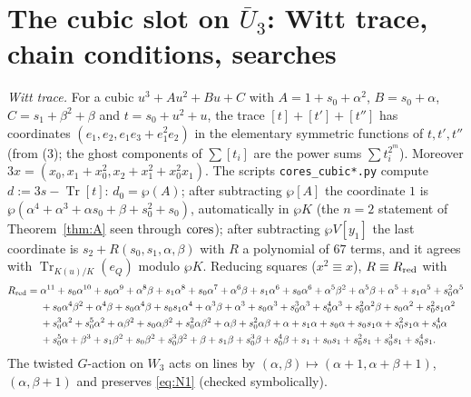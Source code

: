 \section{The cubic slot on \texorpdfstring{$\bar U_3$}{U\_3}: Witt trace, chain
conditions, searches}\label{app:cubic}

\emph{Witt trace.} For a cubic $u^3+Au^2+Bu+C$ with $A=1+s_0+\alpha^2$, $B=s_0+\alpha$,
$C=s_1+\beta^2+\beta$ and $t=s_0+u^2+u$, the trace $[t]+[t']+[t'']$ has coordinates
$(e_1,e_2,e_1e_3+e_1^2e_2)$ in the elementary symmetric functions of $t,t',t''$
(from (3); the ghost components of $\sum[t_i]$ are the power sums $\sum t_i^{2^m}$).
Moreover $3x=(x_0,x_1+x_0^2,x_2+x_1^2+x_0^2x_1)$. The scripts \texttt{cores\_cubic*.py}
compute $d:=3s-\operatorname{Tr}[t]$: $d_0=\wp(A)$; after subtracting $\wp[A]$ the
coordinate $1$ is $\wp(\alpha^4+\alpha^3+\alpha s_0+\beta+s_0^2+s_0)$, automatically in
$\wp K$ (the $n=2$ statement of Theorem~\ref{thm:A} seen through $\operatorname{cores}$); after
subtracting $\wp V[y_1]$ the last coordinate is $s_2+R(s_0,s_1,\alpha,\beta)$ with $R$ a
polynomial of $67$ terms, and it agrees with $\operatorname{Tr}_{K(u)/K}(e_Q)$ modulo
$\wp K$. Reducing squares ($x^2\equiv x$), $R\equiv R_{\rm red}$ with
{\small\begin{align*}
R_{\rm red}={}&\alpha^{11}+s_0\alpha^{10}+s_0\alpha^9+\alpha^8\beta+s_1\alpha^8+s_0\alpha^7
+\alpha^6\beta+s_1\alpha^6+s_0\alpha^6+\alpha^5\beta^2+\alpha^5\beta+\alpha^5+s_1\alpha^5+s_0^2\alpha^5\\
&+s_0\alpha^4\beta^2+\alpha^4\beta+s_0\alpha^4\beta+s_0s_1\alpha^4+\alpha^3\beta
+\alpha^3+s_0\alpha^3+s_0^3\alpha^3+s_0^4\alpha^3+s_0^2\alpha^2\beta+s_0\alpha^2+s_0^2s_1\alpha^2\\
&+s_0^3\alpha^2+s_0^5\alpha^2+\alpha\beta^2+s_0\alpha\beta^2+s_0^2\alpha\beta^2
+\alpha\beta+s_0^2\alpha\beta+\alpha+s_1\alpha+s_0\alpha+s_0s_1\alpha+s_0^2s_1\alpha+s_0^4\alpha\\
&+s_0^5\alpha+\beta^3+s_1\beta^2+s_0\beta^2+s_0^3\beta^2+\beta+s_1\beta
+s_0^3\beta+s_0^4\beta+s_1+s_0s_1+s_0^2s_1+s_0^3s_1+s_0^4s_1 .
\end{align*}}
The twisted $G$-action on $W_3$ acts on lines by $(\alpha,\beta)\mapsto(\alpha+1,
\alpha+\beta+1)$, $(\alpha,\beta+1)$ and preserves \eqref{eq:N1} (checked symbolically).

